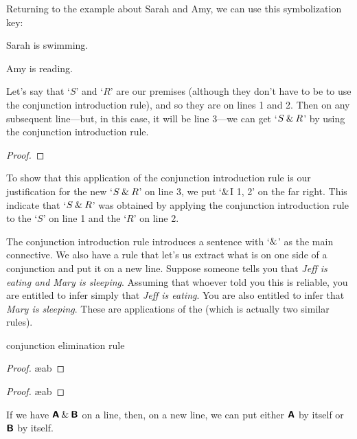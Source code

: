 Returning to the example about Sarah and Amy, we can use this symbolization key:
	\begin{ekey}
		\item[S] Sarah is swimming.
		\item[R] Amy is reading.
	\end{ekey}
Let's say that `$S$' and `$R$' are our premises (although they don't have to be to use the conjunction introduction rule), and so they are on lines 1 and 2. Then on any subsequent line---but, in this case, it will be line 3---we can get `$S \mathbin{\&} R$' by using the conjunction introduction rule.
\begin{proof}
	 \pr{}
	 \pr{}
	 
\end{proof}
To show that this application of the conjunction introduction rule is our justification for the new `$S \mathbin{\&} R$' on line 3, we put `$\mathbin{\&}$I 1, 2' on the far right. This indicate that `$S \mathbin{\&} R$' was obtained by applying the conjunction introduction rule to the `$S$' on line 1 and the `$R$' on line 2. 

The conjunction introduction rule introduces a sentence with `$\mathbin{\&}$' as the main connective. We also have a rule that let's us extract what is on one side of a conjunction and put it on a new line. Suppose someone tells you that \textit{Jeff is eating and Mary is sleeping}. Assuming that whoever told you this is reliable, you are entitled to infer simply that \textit{Jeff is eating}. You are also entitled to infer that \textit{Mary is sleeping}. These are applications of the  (which is actually two similar rules).

\begin{factboxy}{conjunction elimination rule}
\begin{proof}
	 \ae{ab}
\end{proof}

\begin{proof}
	 \ae{ab}
\end{proof}

\small{If we have $\bm{\mathsf{A}} \mathbin{\&} \bm{\mathsf{B}}$ on a line, then, on a new line, we can put either $\bm{\mathsf{A}}$ by itself or $\bm{\mathsf{B}}$ by itself.}

\end{factboxy}

